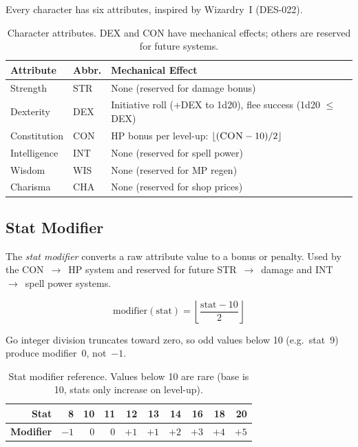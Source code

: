 \documentclass[a4paper,10pt]{article}
\newcommand{\stat}[1]{\textsc{#1}}
\begin{document}
Every character has six attributes, inspired by Wizardry~I (DES-022).

\begin{table}[h]
\centering
\begin{tabular}{@{}llp{7cm}@{}}
\toprule
\textbf{Attribute} & \textbf{Abbr.} & \textbf{Mechanical Effect} \\
\midrule
Strength     & \stat{STR} & None (reserved for damage bonus) \\
Dexterity    & \stat{DEX} & Initiative roll (+\stat{DEX} to 1d20), flee success (1d20 $\leq$ \stat{DEX}) \\
Constitution & \stat{CON} & HP bonus per level-up: $\lfloor(\stat{CON} - 10) / 2\rfloor$ \\
Intelligence & \stat{INT} & None (reserved for spell power) \\
Wisdom       & \stat{WIS} & None (reserved for MP regen) \\
Charisma     & \stat{CHA} & None (reserved for shop prices) \\
\bottomrule
\end{tabular}
\caption{Character attributes. \stat{DEX} and \stat{CON} have mechanical effects;
         others are reserved for future systems.}
\label{tab:attributes}
\end{table}

\subsection{Stat Modifier}

The \emph{stat modifier} converts a raw attribute value to a bonus or
penalty. Used by the \stat{CON}~$\to$~HP system and reserved for future
\stat{STR}~$\to$~damage and \stat{INT}~$\to$~spell power systems.

\[
  \text{modifier}(\text{stat}) = \left\lfloor \frac{\text{stat} - 10}{2} \right\rfloor
\]

Go integer division truncates toward zero, so odd values below 10
(e.g.\ stat~9) produce modifier~0, not~$-1$.

\begin{table}[h]
\centering
\begin{tabular}{@{}rrrrrrrrrr@{}}
\toprule
\textbf{Stat} & 8 & 10 & 11 & 12 & 13 & 14 & 16 & 18 & 20 \\
\midrule
\textbf{Modifier} & $-1$ & 0 & 0 & $+1$ & $+1$ & $+2$ & $+3$ & $+4$ & $+5$ \\
\bottomrule
\end{tabular}
\caption{Stat modifier reference. Values below 10 are rare (base is 10,
         stats only increase on level-up).}
\end{table}
\end{document}
